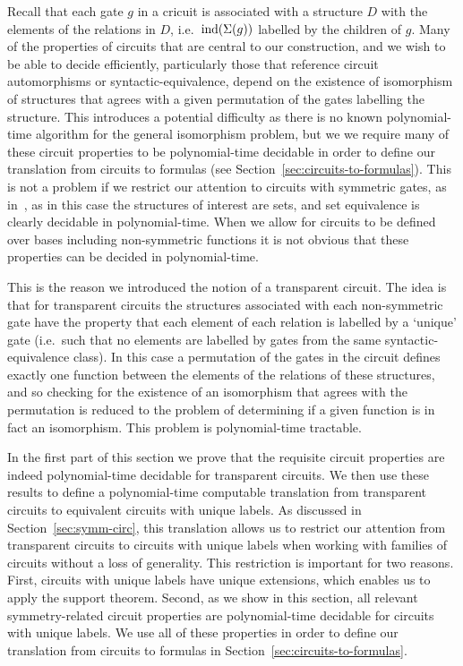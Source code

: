 \documentclass[../main/thesis.tex]{subfiles}
\begin{document}
Recall that each gate $g$ in a cricuit is associated with a structure $D$ with
the elements of the relations in $D$, i.e.\ $\text{\upshape ind}(\Sigma(g))$ labelled by the
children of $g$. Many of the properties of circuits that are central to our
construction, and we wish to be able to decide efficiently, particularly those
that reference circuit automorphisms or syntactic-equivalence, depend on the
existence of isomorphism of structures that agrees with a given permutation of
the gates labelling the structure. This introduces a potential difficulty as
there is no known polynomial-time algorithm for the general isomorphism problem,
but we we require many of these circuit properties to be polynomial-time
decidable in order to define our translation from circuits to formulas (see
Section~\ref{sec:circuits-to-formulas}). This is not a problem if we restrict
our attention to circuits with symmetric gates, as in~\cite{AndersonD17}, as in
this case the structures of interest are sets, and set equivalence is clearly
decidable in polynomial-time. When we allow for circuits to be defined over
bases including non-symmetric functions it is not obvious that these properties
can be decided in polynomial-time.

This is the reason we introduced the notion of a transparent circuit. The idea
is that for transparent circuits the structures associated with each
non-symmetric gate have the property that each element of each relation is
labelled by a `unique' gate (i.e.\ such that no elements are labelled by gates
from the same syntactic-equivalence class). In this case a permutation of the
gates in the circuit defines exactly one function between the elements of the
relations of these structures, and so checking for the existence of an
isomorphism that agrees with the permutation is reduced to the problem of
determining if a given function is in fact an isomorphism. This problem is
polynomial-time tractable.

In the first part of this section we prove that the requisite circuit properties
are indeed polynomial-time decidable for transparent circuits. We then use these
results to define a polynomial-time computable translation from transparent
circuits to equivalent circuits with unique labels. As discussed in
Section~\ref{sec:symm-circ}, this translation allows us to restrict our
attention from transparent circuits to circuits with unique labels when working
with families of circuits without a loss of generality. This restriction is
important for two reasons. First, circuits with unique labels have unique
extensions, which enables us to apply the support theorem. Second, as we show in
this section, all relevant symmetry-related circuit properties are
polynomial-time decidable for circuits with unique labels. We use all of these
properties in order to define our translation from circuits to formulas in
Section~\ref{sec:circuits-to-formulas}.
\end{document}
